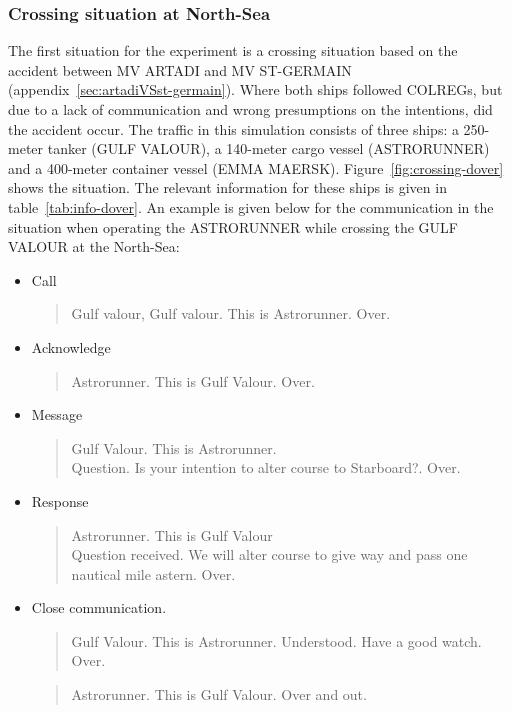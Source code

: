 \subsubsection{Crossing situation at North-Sea}
\label{ssec:crossing-north-sea}
The first situation for the experiment is a crossing situation based on the accident between MV ARTADI and MV ST-GERMAIN (appendix~\ref{sec:artadiVSst-germain}). Where both ships followed COLREGs, but due to a lack of communication and wrong presumptions on the intentions, did the accident occur. 
The traffic in this simulation consists of three ships: a 250-meter tanker (GULF VALOUR), a 140-meter cargo vessel (ASTRORUNNER) and a 400-meter container vessel (EMMA MAERSK). Figure~\ref{fig:crossing-dover} shows the situation. The relevant information for these ships is given in table~\ref{tab:info-dover}.
An example is given below for the communication in the situation when operating the ASTRORUNNER while crossing the GULF VALOUR at the North-Sea:
\begin{spacing}{1}
	\begin{itemize}
		\item Call
		\begin{quote}
			Gulf valour, Gulf valour. This is Astrorunner. Over.
		\end{quote}
		\item Acknowledge
		\begin{quote}
			Astrorunner. This is Gulf Valour. Over.
		\end{quote}
		\item Message
		\begin{quote}
			Gulf Valour. This is Astrorunner. \\
			Question. Is your intention to alter course to Starboard?. Over.
		\end{quote}
		\item Response
		\begin{quote}
			Astrorunner. This is Gulf Valour \\
			Question received. We will alter course to give way and pass one nautical mile astern. Over.
		\end{quote}
		\item Close communication.
		\begin{quote}
			Gulf Valour. This is Astrorunner.
			Understood. Have a good watch. Over.
		\end{quote}
		\begin{quote}
			Astrorunner. This is Gulf Valour. Over and out.
		\end{quote}
	\end{itemize}
\end{spacing}

